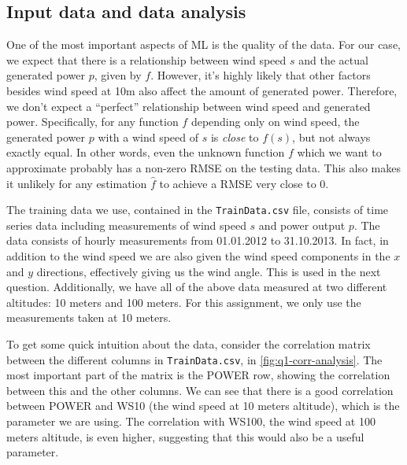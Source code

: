 \documentclass[11pt]{article}
\begin{document}


\subsection*{Input data and data analysis}
One of the most important aspects of ML is the quality of the data. For our case, we expect that there is a relationship between wind speed $s$ and the actual generated power $p$, given by $f$. 
However, it's highly likely that other factors besides wind speed at 10m also affect the amount of generated power.
Therefore, we don't expect a ``perfect'' relationship between wind speed and generated power.
Specifically, for any function $f$ depending only on wind speed, the generated power $p$ with a wind speed of $s$ is \emph{close} to $f(s)$, but not always exactly equal.
In other words, even the unknown function $f$ which we want to approximate probably has a non-zero RMSE on the testing data.
This also makes it unlikely for any estimation $\hat{f}$ to achieve a RMSE very close to 0.

The training data we use, contained in the \texttt{TrainData.csv} file, consists of time series data including measurements of wind speed $s$ and power output $p$.
The data consists of hourly measurements from 01.01.2012 to 31.10.2013.
In fact, in addition to the wind speed we are also given the wind speed components in the $x$ and $y$ directions, effectively giving us the wind angle.
This is used in the next question.
Additionally, we have all of the above data measured at two different altitudes: 10 meters and 100 meters.
For this assignment, we only use the measurements taken at 10 meters.

To get some quick intuition about the data, consider the correlation matrix between the different columns in \texttt{TrainData.csv}, in \cref{fig:q1-corr-analysis}.
The most important part of the matrix is the POWER row, showing the correlation between this and the other columns.
We can see that there is a good correlation between POWER and WS10 (the wind speed at 10 meters altitude), which is the parameter we are using.
The correlation with WS100, the wind speed at 100 meters altitude, is even higher, suggesting that this would also be a useful parameter.
\end{document}
